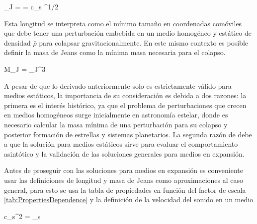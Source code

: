 { \lambda_J =  = 
c_s ^{1/2} }


Esta longitud se interpreta como el mínimo tamaño en coordenadas comóviles 
que debe tener una perturbación embebida en un medio homogéneo y estático
de densidad $\bar \rho$ para colapsar gravitacionalmente. En este mismo 
contexto es posible definir la masa de Jeans como la mínima masa necesaria
para el colapso.


{ M_J = \pi \lambda_J^3 \propto {} }


A pesar de que lo derivado anteriormente solo es estrictamente válido para 
medios estáticos, la importancia de su consideración es debida a dos 
razones: la primera es el interés histórico, ya que el problema de 
perturbaciones que crecen en medios homogéneos surge inicialmente en 
astronomía estelar, donde es necesario calcular la masa mínima de una 
perturbación para su colapso y posterior formación de estrellas y sistemas 
planetarios. La segunda razón de debe a que la solución para medios 
estáticos sirve para evaluar el comportamiento asintótico y la validación 
de las soluciones generales para medios en expansión.


Antes de proseguir con las soluciones para medios en expansión es 
conveniente usar las definiciones de longitud y masa de Jeans como 
aproximaciones al caso general, para esto se usa la tabla de propiedades en
función del factor de escala \ref{tab:PropertiesDependence} y la definición 
de la velocidad del sonido en un medio \cite{pathria1996}
	

{ c_s^2 = _s }



